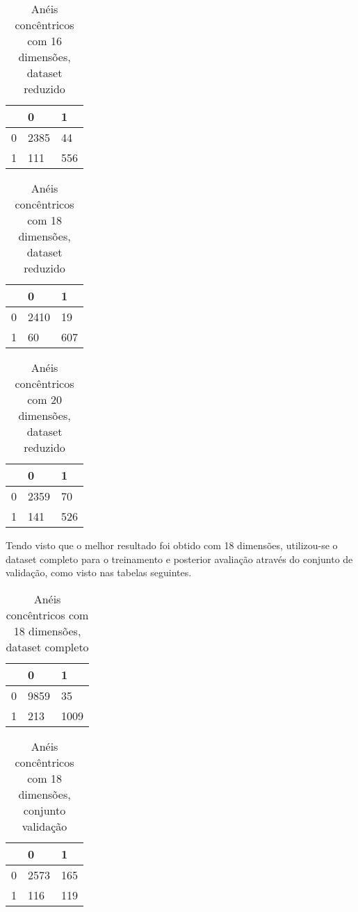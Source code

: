 \begin{table}[h]
\centering
\caption{Anéis concêntricos com 16 dimensões, dataset reduzido}
\begin{tabular}{l|l|l|}
\cline{2-3}
                        & 0 & 1 \\ \hline
\multicolumn{1}{|l|}{0} & 2385 & 44 \\ \hline
\multicolumn{1}{|l|}{1} & 111 & 556 \\ \hline
\end{tabular}
\end{table}

\begin{table}[h]
\centering
\caption{Anéis concêntricos com 18 dimensões, dataset reduzido}
\begin{tabular}{l|l|l|}
\cline{2-3}
                        & 0 & 1 \\ \hline
\multicolumn{1}{|l|}{0} & 2410 & 19 \\ \hline
\multicolumn{1}{|l|}{1} & 60 & 607 \\ \hline
\end{tabular}
\end{table}

\begin{table}[h!]
\centering
\caption{Anéis concêntricos com 20 dimensões, dataset reduzido}
\begin{tabular}{l|l|l|}
\cline{2-3}
                        & 0 & 1 \\ \hline
\multicolumn{1}{|l|}{0} & 2359 & 70 \\ \hline
\multicolumn{1}{|l|}{1} & 141 & 526 \\ \hline
\end{tabular}
\end{table}

Tendo visto que o melhor resultado foi obtido com 18 dimensões, utilizou-se o dataset completo para o treinamento e posterior avaliação através do conjunto de validação, como visto nas tabelas seguintes.

\begin{table}[h!]
\centering
\caption{Anéis concêntricos com 18 dimensões, dataset completo}
\begin{tabular}{l|l|l|}
\cline{2-3}
                        & 0 & 1 \\ \hline
\multicolumn{1}{|l|}{0} & 9859 & 35 \\ \hline
\multicolumn{1}{|l|}{1} & 213 & 1009 \\ \hline
\end{tabular}
\end{table}

\begin{table}[h!]
\centering
\caption{Anéis concêntricos com 18 dimensões, conjunto validação}
\begin{tabular}{l|l|l|}
\cline{2-3}
                        & 0 & 1 \\ \hline
\multicolumn{1}{|l|}{0} & 2573 & 165 \\ \hline
\multicolumn{1}{|l|}{1} & 116  & 119 \\ \hline
\end{tabular}
\end{table}
